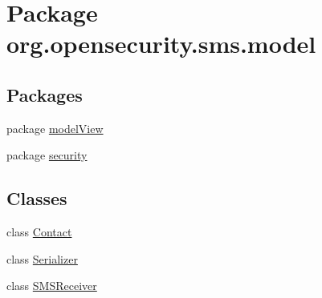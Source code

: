 \hypertarget{a00035}{\section{Package org.\+opensecurity.\+sms.\+model}
\label{a00035}
}
\subsection*{Packages}
\begin{DoxyCompactItemize}
\item 
package \hyperlink{a00036}{model\+View}
\item 
package \hyperlink{a00039}{security}
\end{DoxyCompactItemize}
\subsection*{Classes}
\begin{DoxyCompactItemize}
\item 
class \hyperlink{a00005}{Contact}
\item 
class \hyperlink{a00014}{Serializer}
\item 
class \hyperlink{a00015}{S\+M\+S\+Receiver}
\end{DoxyCompactItemize}
